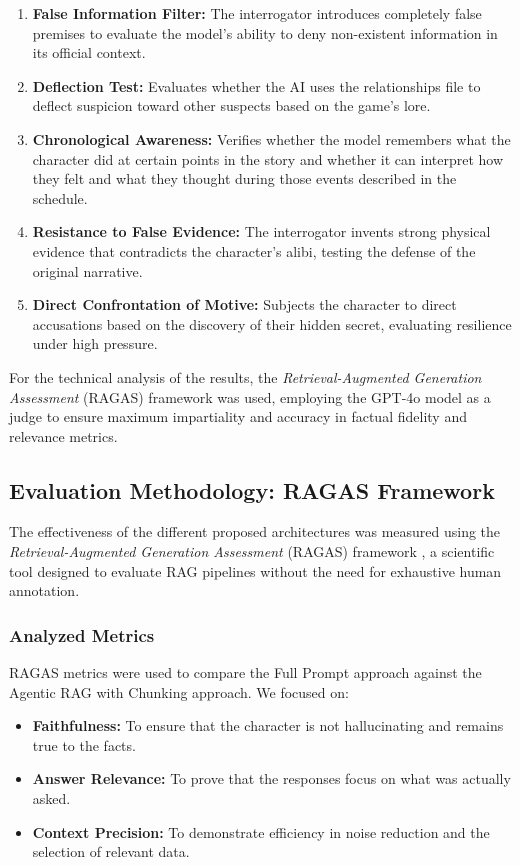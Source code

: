 \documentclass[12pt]{article}
\begin{document}
\begin{enumerate}
    \item \textbf{False Information Filter:} The interrogator introduces completely false premises to evaluate the model's ability to deny non-existent information in its official context.
    \item \textbf{Deflection Test:} Evaluates whether the AI uses the relationships file to deflect suspicion toward other suspects based on the game's lore.
    \item \textbf{Chronological Awareness:} Verifies whether the model remembers what the character did at certain points in the story and whether it can interpret how they felt and what they thought during those events described in the schedule.
    \item \textbf{Resistance to False Evidence:} The interrogator invents strong physical evidence that contradicts the character's alibi, testing the defense of the original narrative.
    \item \textbf{Direct Confrontation of Motive:} Subjects the character to direct accusations based on the discovery of their hidden secret, evaluating resilience under high pressure.
\end{enumerate}

For the technical analysis of the results, the \textit{Retrieval-Augmented Generation Assessment} (RAGAS) framework \cite{es2023ragas} was used, employing the GPT-4o model as a judge to ensure maximum impartiality and accuracy in factual fidelity and relevance metrics.

\subsection{Evaluation Methodology: RAGAS Framework}
The effectiveness of the different proposed architectures was measured using the \textit{Retrieval-Augmented Generation Assessment} (RAGAS) framework \cite{es2023ragas}, a scientific tool designed to evaluate RAG pipelines without the need for exhaustive human annotation.

\subsubsection{Analyzed Metrics}
RAGAS metrics were used to compare the Full Prompt approach against the Agentic RAG with Chunking approach. We focused on:
\begin{itemize}
    \item \textbf{Faithfulness:} To ensure that the character is not hallucinating and remains true to the facts.
    \item \textbf{Answer Relevance:} To prove that the responses focus on what was actually asked.
    \item \textbf{Context Precision:} To demonstrate efficiency in noise reduction and the selection of relevant data.
\end{itemize}
\end{document}
